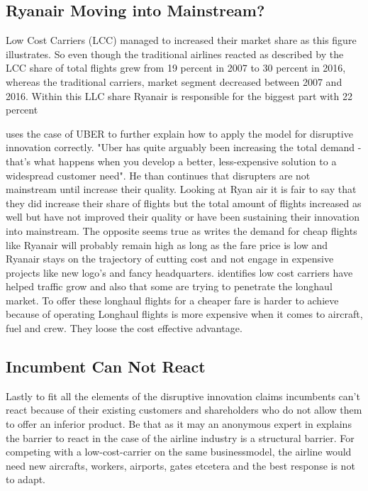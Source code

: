\documentclass[a4paper, 11pt]{article}
\begin{document}
\subsection{Ryanair Moving into Mainstream?}
\label{limits}


Low Cost Carriers (LCC) managed to increased their market share as this figure illustrates. So even though the traditional airlines reacted as described by \citep{Dennis} the LCC share of total flights grew from 19 percent in 2007 to 30 percent in 2016, whereas the traditional carriers, market segment decreased between 2007 and 2016. Within this LLC share Ryanair is responsible for the biggest part with 22 percent \citep{Eurocontrol2017}

\citep{Christensen2015} uses the case of UBER to further explain how to apply the model for disruptive innovation correctly. "Uber has quite arguably been increasing the total demand - that's what happens when you develop a better, less-expensive solution to a widespread customer need"\citep[p. 4]{Christensen2015}. He than continues that disrupters are not mainstream until increase their quality. Looking at Ryan air it is fair to say that they did increase their share of flights but the total amount of flights increased as well \citep{Eurocontrol2018} but have not improved their quality or have been sustaining their innovation into mainstream. The opposite seems true as \citep{Barrett} writes the demand for cheap flights like Ryanair will probably remain high as long as the fare price is low and Ryanair stays on the trajectory of cutting cost and not engage in expensive projects like new logo's and fancy headquarters. \cite{Eurocontrol2018} identifies low cost carriers have helped traffic grow and also that some are trying to penetrate the longhaul market. To offer these longhaul flights for a cheaper fare is harder to achieve because of operating Longhaul flights is more expensive when it comes to aircraft, fuel and crew. They loose the cost effective advantage.


\subsection{Incumbent Can Not React}
\label{reaction}

Lastly to fit all the elements of the disruptive innovation \cite{Christensen97} claims incumbents can't react because of their existing customers and shareholders who do not allow them to offer an inferior product.
Be that as it may an anonymous expert in \cite{King} explains the barrier to react in the case of the airline industry is a structural barrier. For competing with a low-cost-carrier on the same businessmodel, the airline would need new aircrafts, workers, airports, gates etcetera and the best response is not to adapt.
\end{document}
